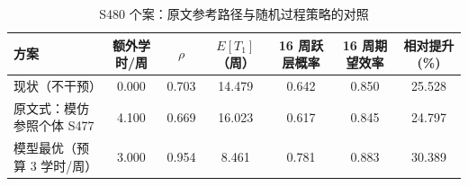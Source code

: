 \begin{table}[htbp]
\centering
\small
\caption{S480 个案：原文参考路径与随机过程策略的对照}
\label{tab:s480}
\begin{tabular}{lcccccc}
\toprule
方案 & 额外学时/周 & $\rho$ & $E[T_1]$（周） & 16 周跃层概率 & 16 周期望效率 & 相对提升(\%) \\
\midrule
现状（不干预） & 0.000 & 0.703 & 14.479 & 0.642 & 0.850 & 25.528 \\
原文式：模仿参照个体 S477 & 4.100 & 0.669 & 16.023 & 0.617 & 0.845 & 24.797 \\
模型最优（预算 3 学时/周） & 3.000 & 0.954 & 8.461 & 0.781 & 0.883 & 30.389 \\
\bottomrule
\end{tabular}
\end{table}
